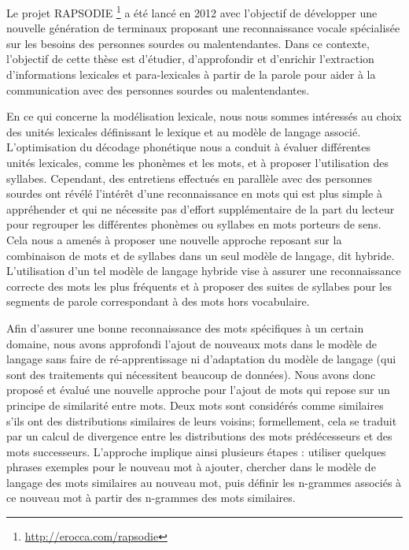 \documentclass{style/these}
\newcommand\fnurl[2]{%
  \href{#2}{#1}\footnote{\url{#2}}%
}
\begin{document}
{
Le projet  RAPSODIE \fnurl{}{http://erocca.com/rapsodie} a été lancé en 2012 avec l'objectif de développer une nouvelle génération de terminaux proposant une reconnaissance vocale spécialisée sur les besoins des personnes sourdes ou malentendantes. Dans ce contexte, l'objectif de cette thèse est d'étudier, d'approfondir et d'enrichir l'extraction d'informations lexicales et para-lexicales à partir de la parole pour aider à la communication avec des personnes sourdes ou malentendantes. 

En ce qui concerne la modélisation lexicale, nous nous sommes intéressés au choix des unités lexicales définissant le lexique et au modèle de langage associé. 
L'optimisation du décodage phonétique nous a conduit à évaluer différentes unités lexicales, comme les phonèmes et les mots, et à proposer l'utilisation des syllabes. 
Cependant, des entretiens effectués en parallèle avec des personnes sourdes ont révélé l'intérêt d'une reconnaissance en mots qui est plus simple à appréhender et qui ne nécessite pas d'effort supplémentaire de la part du lecteur pour regrouper les différentes phonèmes ou syllabes en mots porteurs de sens. 
Cela nous a amenés à proposer une nouvelle approche reposant sur la combinaison de mots et de syllabes dans un seul modèle de langage, dit hybride. 
L'utilisation d'un tel modèle de langage hybride vise à assurer une reconnaissance correcte des mots les plus fréquents et à proposer des suites de syllabes pour les segments de parole correspondant à des mots hors vocabulaire. 
 
Afin d'assurer une bonne reconnaissance des mots spécifiques à un certain domaine, nous avons approfondi l'ajout de nouveaux mots dans le modèle de langage sans faire de ré-apprentissage ni d'adaptation du modèle de langage (qui sont des traitements qui nécessitent beaucoup de données). 
Nous avons donc proposé et évalué une nouvelle approche pour l'ajout de mots qui repose sur un principe de similarité entre mots. 
Deux mots sont considérés comme similaires  s'ils ont des distributions similaires de leurs voisins; formellement, cela se traduit par un calcul de divergence entre les distributions des mots prédécesseurs et des mots successeurs.
L'approche implique ainsi plusieurs étapes : utiliser quelques phrases exemples pour le nouveau mot à ajouter, chercher dans le modèle de langage des mots similaires au nouveau mot, puis définir les n-grammes associés à ce nouveau mot à partir des n-grammes des mots similaires.

}
\end{document}
